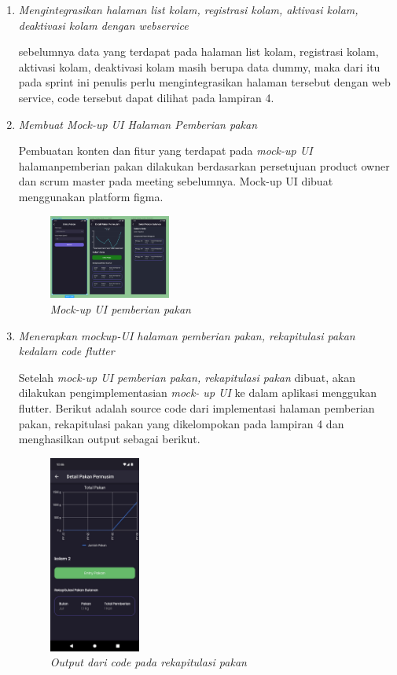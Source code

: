 \begin{enumerate}[listparindent=2em]

	\item {\textit{Mengintegrasikan halaman list kolam, registrasi kolam, aktivasi kolam, deaktivasi kolam dengan webservice}}

  sebelumnya data yang terdapat pada halaman list kolam, registrasi kolam, aktivasi kolam, deaktivasi kolam masih berupa data dummy, maka dari itu pada sprint ini penulis perlu mengintegrasikan halaman tersebut dengan web service, code tersebut dapat dilihat pada lampiran 4.


	\item{\textit{Membuat Mock-up UI Halaman Pemberian pakan}}
	
	Pembuatan konten dan fitur yang terdapat pada \textit{mock-up UI} halamanpemberian pakan dilakukan berdasarkan persetujuan product owner dan scrum master pada meeting sebelumnya. Mock-up UI dibuat menggunakan platform figma.
	
	\begin{figure}[H]
	\centering
	\includegraphics[keepaspectratio, width=4cm]{gambar/ssmockuppakan}
	\caption{\textit{Mock-up UI pemberian pakan}}
	\label{gambar:mockupsprint3}
	\end{figure}

	\item{\textit{Menerapkan mockup-UI  halaman pemberian pakan, rekapitulasi pakan kedalam code flutter}}
	
	Setelah \textit{mock-up UI  pemberian pakan, rekapitulasi pakan} dibuat, akan dilakukan pengimplementasian \textit{mock- up UI} ke dalam aplikasi menggukan flutter. Berikut adalah source code dari implementasi halaman  pemberian pakan, rekapitulasi pakan yang dikelompokan pada lampiran 4 dan menghasilkan output sebagai berikut.

	\begin{figure}[H]
	\centering
	\includegraphics[keepaspectratio, width=3cm]{gambar/ssrekappakan}
	\caption{\textit{Output dari code pada rekapitulasi pakan}}
	\label{gambar:ssrekappakan}
	\end{figure}
	

\end{enumerate}

